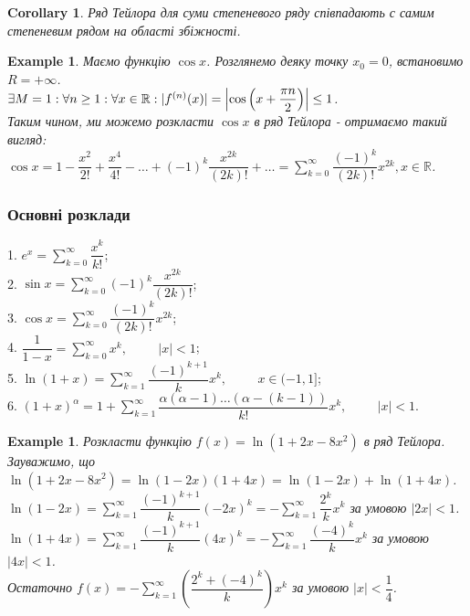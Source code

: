 \documentclass[a4paper, 10pt]{article}
\def\huge{\displaystyle}
\theoremstyle{theoremdd}
\theoremstyle{theoremdd}
\theoremstyle{theoremdd}
\theoremstyle{theoremdd}
\newtheorem{example}[theorem]{Example}
\theoremstyle{theoremdd}
\theoremstyle{theoremdd}
\theoremstyle{theoremdd}
\theoremstyle{theoremdd}
\newtheorem{corollary}[theorem]{Corollary}
\begin{document}
\begin{corollary}
Ряд Тейлора для суми степеневого ряду співпадають с самим степеневим рядом на області збіжності.
\end{corollary}

\begin{example}
Маємо функцію $\cos x$. Розглянемо деяку точку $x_0 = 0$, встановимо $R = +\infty$.\\
$\exists M = 1: \forall n \geq 1: \forall x \in \mathbb{R}: |f^{(n)}(x)| = \abs{\cos \left( x + \dfrac{\pi n}{2} \right)} \leq 1$.\\
Таким чином, ми можемо розкласти $\cos x$ в ряд Тейлора - отримаємо такий вигляд:\\
$\cos x = 1 - \dfrac{x^2}{2!} + \dfrac{x^4}{4!} - \dots + (-1)^k \dfrac{x^{2k}}{(2k)!} + \dots = \huge\sum_{k=0}^\infty \dfrac{(-1)^k}{(2k)!} x^{2k}, x \in \mathbb{R}$.
\end{example}

\subsubsection*{Основні розклади}
1. $e^x = \huge\sum_{k=0}^\infty \dfrac{x^k}{k!}$;\\
2. $\sin x = \huge\sum_{k=0}^\infty (-1)^{k} \dfrac{x^{2k}}{(2k)!}$;\\
3. $\cos x = \huge\sum_{k=0}^\infty \dfrac{(-1)^k}{(2k)!} x^{2k}$;\\
4. $\dfrac{1}{1-x} = \huge\sum_{k=0}^\infty x^k, \hspace{1cm} |x| < 1$;\\
5. $\ln (1+x) = \huge\sum_{k=1}^\infty \dfrac{(-1)^{k+1}}{k} x^k, \hspace{1cm} x \in (-1,1]$;\\
6. $(1+x)^\alpha = 1 + \huge\sum_{k=1}^\infty \dfrac{\alpha (\alpha-1) \dots (\alpha - (k-1))}{k!}x^k, \hspace{1cm} |x| < 1$.

\begin{example}
Розкласти функцію $f(x) = \ln (1+2x-8x^2)$ в ряд Тейлора.\\
Зауважимо, що $\ln (1+2x-8x^2) = \ln (1-2x)(1+4x) = \ln (1-2x) + \ln (1+4x)$.\\
$\ln (1-2x) =  \huge\sum_{k=1}^\infty \dfrac{(-1)^{k+1}}{k}(-2x)^k =- \sum_{k=1}^\infty \dfrac{2^k}{k}x^k$ за умовою $|2x| < 1$.\\
$\ln (1+4x) = \huge\sum_{k=1}^\infty \dfrac{(-1)^{k+1}}{k} (4x)^k = -\sum_{k=1}^\infty \dfrac{(-4)^k}{k}x^k$ за умовою $|4x| < 1$.\\
Остаточно $f(x) = -\huge\sum_{k=1}^\infty \left( \dfrac{2^k+(-4)^k}{k} \right) x^k$ за умовою $|x| < \dfrac{1}{4}$.
\end{example}
\newpage
\end{document}
